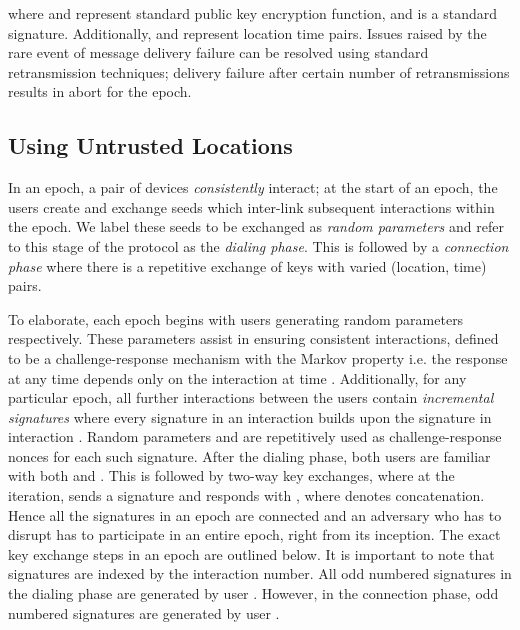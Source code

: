 \documentclass[letterpaper,twocolumn]{sig-alternate}
\begin{document}
where  and  represent standard public key encryption function, and  is a standard signature. Additionally,  and  represent location time pairs. Issues raised by the rare event of message delivery failure can be resolved using standard retransmission techniques; delivery failure after certain number of retransmissions results in abort for the epoch.

\subsection{Using Untrusted Locations}
\label{dp}

In an epoch, a pair of devices {\em consistently} interact; at the start of an epoch, the users create and exchange seeds which inter-link subsequent interactions within the epoch. We label these seeds to be exchanged as {\em random parameters} and refer to this stage of the protocol as the {\em dialing phase}. This is followed by a {\em connection phase} where there is a repetitive exchange of keys with varied (location, time) pairs.

To elaborate, each epoch begins with users  generating random parameters  respectively. These parameters assist in ensuring consistent interactions, defined to be a challenge-response mechanism with the Markov property i.e. the response at any time
 depends only on the interaction at time . Additionally, for any particular epoch, all further interactions between the users contain {\em incremental signatures} where every signature in an interaction  builds upon the signature in interaction . Random parameters  and  are repetitively used as challenge-response nonces for each such signature. After the dialing phase, both users are familiar with both  and . This is followed by  two-way key exchanges, where at the  iteration,  sends a signature  and  responds with , where  denotes concatenation. 
Hence all the signatures in an epoch are connected and an adversary who has to disrupt has to participate in an entire epoch, right from its inception. The exact key exchange steps in an epoch are outlined below. It is important to note that signatures are indexed by the interaction number. All odd numbered signatures in the dialing phase are generated by user . However, in the connection phase, odd numbered signatures are generated by user .
\vspace{-1mm}

\vspace{-6mm}
\end{document}

